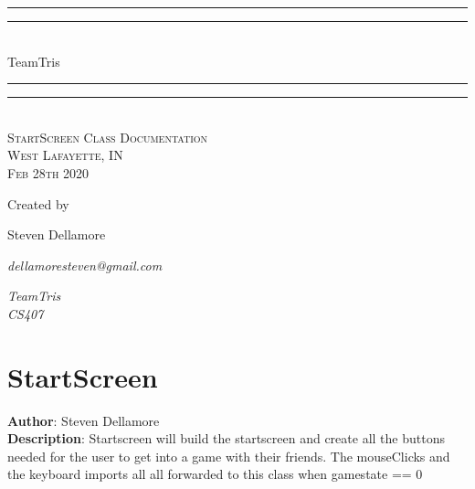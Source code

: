 \documentclass[12pt]{article}
\newlength{\drop}
\begin{document}
  \begin{titlepage}
    \centering
    \textheight
    \vspace*{7\baselineskip}
    \rule{\textwidth}{1.6pt}\vspace*{-\baselineskip}\vspace*{2pt}
    \rule{\textwidth}{0.4pt}\\[\baselineskip]
    {\LARGE TeamTris}\\[0.2\baselineskip]
    \rule{\textwidth}{0.4pt}\vspace*{-\baselineskip}\vspace{3.2pt}
    \rule{\textwidth}{1.6pt}\\[\baselineskip]
    \scshape
    StartScreen Class Documentation \\
    West Lafayette, IN \\
    Feb 28th 2020\par
    \vspace*{2\baselineskip}
    Created by \\[\baselineskip]
    {\Large Steven Dellamore\par}
    {\itshape dellamoresteven@gmail.com\par}
    {\itshape TeamTris \\ CS407\par}
  \end{titlepage}
  
\tableofcontents
\newpage


\section{StartScreen}
\textbf{Author}: Steven Dellamore \\
\textbf{Description}: Startscreen will build the startscreen and create all the buttons needed for the user to get into a game with their friends. The mouseClicks and the keyboard imports all all forwarded to this class when gamestate == 0 \\
\end{document}
